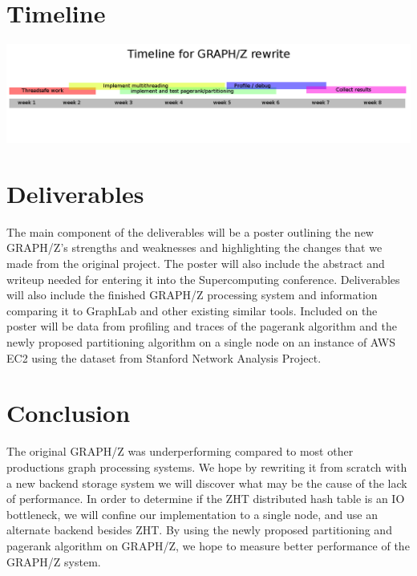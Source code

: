 \documentclass[10pt]{article}
\begin{document}
  \section{Timeline}
  \includegraphics[width=\textwidth]{timeline.png}
\begin{multicols}{2}
  \section{Deliverables}
  The main component of the deliverables will be a poster outlining the new GRAPH/Z's strengths and weaknesses and highlighting the changes that we made from the original project. The poster will also include the abstract and writeup needed for entering it into the Supercomputing conference.  Deliverables will also include the finished GRAPH/Z processing system and information comparing it to GraphLab and other existing similar tools. Included on the poster will be data from profiling and traces of the pagerank algorithm and the newly proposed partitioning algorithm on a single node on an instance of AWS EC2 using the dataset from Stanford Network Analysis Project.
  
   \section{Conclusion}
   The original GRAPH/Z was underperforming compared to most other productions graph processing systems. We hope by rewriting it from scratch with a new backend storage system we will discover what may be the cause of the lack of performance. In order to determine if the ZHT distributed hash table is an IO bottleneck, we will confine our implementation to a single node, and use an alternate backend besides ZHT. By using the newly proposed partitioning and pagerank algorithm on GRAPH/Z, we hope to measure better performance of the GRAPH/Z system. 

   
   
\end{multicols}
\end{document}
